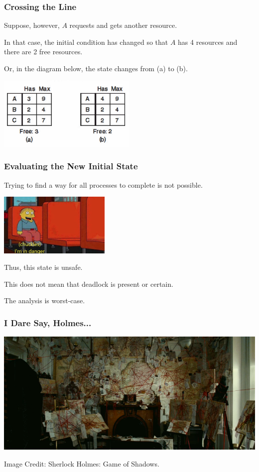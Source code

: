 \begin{frame}
	\frametitle{Crossing the Line}

	Suppose, however, $A$ requests and gets another resource.

	In that case, the initial condition has changed so that $A$ has 4 resources and there are 2 free resources.

	Or, in the diagram below, the state changes from (a) to (b).

	\begin{center}
		\includegraphics[width=0.5\textwidth]{images/unsafe-state-initial.png}
	\end{center}


\end{frame}

\begin{frame}
	\frametitle{Evaluating the New Initial State}

	Trying to find a way for all processes to complete is not possible.
	
	\begin{center}
	\includegraphics[width=0.4\textwidth]{images/danger.jpg}
	\end{center}

	Thus, this state is unsafe.

	This does not mean that deadlock is present or certain.

	The analysis is worst-case.

\end{frame}


\begin{frame}
	\frametitle{I Dare Say, Holmes...}

	\begin{center}
		\includegraphics[width=\textwidth]{images/sherlock-wall.png}
	\end{center}
	\hfill Image Credit: Sherlock Holmes: Game of Shadows.
\end{frame}


